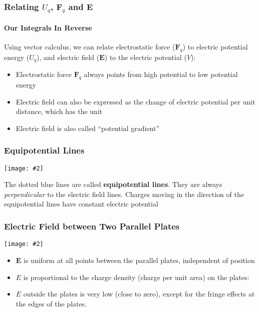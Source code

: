 \documentclass[12pt,aspectratio=169]{beamer}
\newcommand{\pic}[2]{\texttt{[image: \#2]}}
\newcommand{\mb}[1]{\mathbf{#1}}
\newcommand{\eq}[2]{\vspace{#1}{\Large\begin{displaymath}#2\end{displaymath}}}
\begin{document}
\begin{frame}
  \frametitle{Relating $U_q$, $\mb{F}_q$ and $\mb{E}$}
  \framesubtitle{Our Integrals In Reverse}
  Using vector calculus, we can relate electrostatic force ($\mb{F}_q$) to
  electric potential energy ($U_q$), and electric field ($\mb{E}$) to the
  electric potential ($V$):

  \eq{-.2in}{
    \mb{F}_q=-\nabla U_q=-\frac{\partial U_q}{\partial r}\hat{\mb{r}}
    \quad\;\;
    \mb{E}=-\nabla V=-\frac{\partial V}{\partial r}\hat{\mb{r}}
  }

  \begin{itemize}  
  \item\vspace{-.2in}Electrostatic force $\mb{F}_q$ always points from high
    potential to low potential energy
  \item Electric field can also be expressed as the change of electric
    potential per unit distance, which has the unit
    
    \eq{-.25in}{
      \SI{1}{\newton\per\coulomb}=\SI{1}{\volt\per\metre}
    }
  \item Electric field is also called ``potential gradient''
  \end{itemize}
\end{frame}



\begin{frame}
  \frametitle{Equipotential Lines}
  \begin{center}
    \pic{0.65}{plate3.png}
  \end{center}

  \vspace{-.2in}The dotted blue lines are called \textbf{equipotential lines}.
  They are always \emph{perpendicular} to the electric field lines. Charges
  moving in the direction of the equipotential lines have constant electric  potential
\end{frame}

\begin{frame}
  \frametitle{Electric Field between Two Parallel Plates}
  \begin{center}
    \pic{.6}{elfield-600x205.jpg}
  \end{center}
  
  \vspace{-.2in}
  \begin{itemize}
  \item $\mb{E}$ is uniform at all points between the
    parallel plates, independent of position
  \item $E$ is proportional to the charge density (charge per unit
    area) on the plates:

    \eq{-.2in}{
      E\propto\sigma\quad\textsf{\normalsize where}\quad
      \sigma=\frac{q}{A}
    }
  \item $E$ outside the plates is very low (close to zero), except for
    the fringe effects at the edges of the plates. 
  \end{itemize}
\end{frame}
\end{document}
